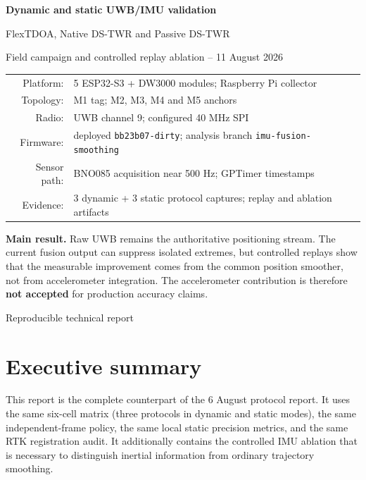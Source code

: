 \documentclass[10pt,a4paper]{article}
\begin{document}
\begin{titlepage}
\centering
\vspace*{16mm}
{\Huge\bfseries Dynamic and static UWB/IMU validation\par}
\vspace{4mm}
{\Large FlexTDOA, Native DS-TWR and Passive DS-TWR\par}
\vspace{11mm}
{\large Field campaign and controlled replay ablation -- 11 August 2026\par}
\vspace{12mm}
\begin{tabular}{rl}
Platform: & 5 ESP32-S3 + DW3000 modules; Raspberry Pi collector\\
Topology: & M1 tag; M2, M3, M4 and M5 anchors\\
Radio: & UWB channel 9; configured 40 MHz SPI\\
Firmware: & deployed \texttt{bb23b07-dirty}; analysis branch \texttt{imu-fusion-smoothing}\\
Sensor path: & BNO085 acquisition near 500 Hz; GPTimer timestamps\\
Evidence: & 3 dynamic + 3 static protocol captures; replay and ablation artifacts\\
\end{tabular}
\vfill
\colorbox{warning}{\parbox{0.89\textwidth}{\vspace{2mm}
\textbf{Main result.} Raw UWB remains the authoritative positioning stream.
The current fusion output can suppress isolated extremes, but controlled
replays show that the measurable improvement comes from the common position
smoother, not from accelerometer integration. The accelerometer contribution
is therefore \textbf{not accepted} for production accuracy claims.
\vspace{2mm}}}
\vfill
{\large Reproducible technical report\par}
\end{titlepage}

\tableofcontents
\clearpage
{}

\section{Executive summary}

This report is the complete counterpart of the 6 August protocol report. It
uses the same six-cell matrix (three protocols in dynamic and static modes),
the same independent-frame policy, the same local static precision metrics,
and the same RTK registration audit. It additionally contains the controlled
IMU ablation that is necessary to distinguish inertial information from
ordinary trajectory smoothing.
\end{document}
